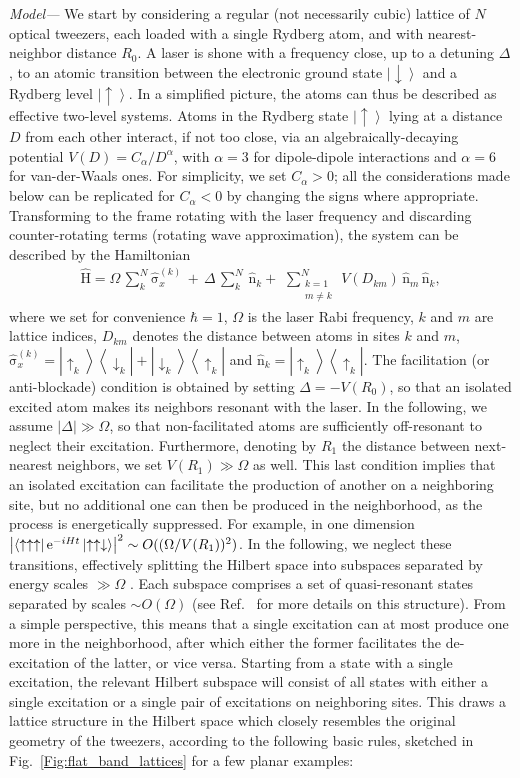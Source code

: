 \documentclass[prl,aps,twocolumn,showpacs,superscriptaddress,longbibliography]{revtex4-1}
\newcommand{\rme}[1]{{\rm{e}}^{#1}}
\newcommand{\lan}{\left\langle}
\newcommand{\ran}{\right\rangle}
\newcommand{\abs}[1]{\left| #1 \right|}
\newcommand{\ket}[1]{\left| #1 \ran}
\newcommand{\bra}[1]{\lan #1 \right|}
\newcommand{\proj}[1]{\ket{#1} \bra{#1}}
\newcommand{\up}{\uparrow}
\newcommand{\down}{\downarrow}
\newcommand{\op}[1]{\mathrm{\hat{#1}}}
\begin{document}
\emph{Model---} We start by considering a regular (not necessarily cubic) lattice of $N$ optical tweezers, each loaded with a single Rydberg atom, and with nearest-neighbor distance $R_0$. A laser is shone with a frequency close, up to a detuning $\Delta$, to an atomic transition between the electronic ground state $\ket{\down}$ and a Rydberg level $\ket{\up}$. In a simplified picture, the atoms can thus be described as effective two-level systems. Atoms in the Rydberg state $\ket{\up}$ lying at a distance $D$ from each other interact, if not too close, via an algebraically-decaying potential $V(D) = C_\alpha / D^\alpha$, with $\alpha = 3$ for dipole-dipole interactions and $\alpha = 6$ for van-der-Waals ones. For simplicity, we set $C_\alpha > 0$; all the considerations made below can be replicated for $C_\alpha < 0$ by changing the signs where appropriate. Transforming to the frame rotating with the laser frequency and discarding counter-rotating terms (rotating wave approximation), the system can be described by the Hamiltonian 
%
\begin{align}
 \op{H} = \Omega \, \sum_k^N  \op{\sigma}_x^{(k)} \, + \, \Delta\, \sum_k^N\,\op{n}_k +\,  \,
 \sum_{\substack{k= 1\\ m \ne k}}^N \, V(D_{km}) \, \op{n}_m\, \op{n}_k,
 \label{Eq:Hamil_full}
\end{align}
%
where we set for convenience $\hbar=1$, $\Omega$ is the laser Rabi frequency, $k$ and $m$ are lattice indices, $D_{km}$ denotes the distance between atoms in sites $k$ and $m$, $\op{\sigma}_x^{(k)} = \ket{\up_k} \bra{\down_k} + \ket{\down_k} \bra{\up_k}$ and $\op{n}_k = \proj{\up_k}$. The facilitation (or anti-blockade) condition is obtained by setting $\Delta = -V(R_0)$, so that an isolated excited atom makes its neighbors resonant with the laser. In the following, we assume $\abs{\Delta} \gg \Omega$, so that non-facilitated atoms are sufficiently off-resonant to neglect their excitation. Furthermore, denoting by $R_1$ the distance between next-nearest neighbors, we set $V(R_1) \gg \Omega$ as well. This last condition implies that an isolated excitation can facilitate the production of another on a neighboring site, but no additional one can then be produced in the neighborhood, as the process is energetically suppressed. For example, in one dimension $\abs{\bra{\up \up \up} \rme{-iHt} \ket{\up \up \down}}^2 \sim O((\Omega / V(R_1))^2)$. In the following, we neglect these transitions, effectively splitting the Hilbert space into subspaces separated by energy scales $\gg \Omega$ . Each subspace comprises a set of quasi-resonant states separated by scales $\sim O(\Omega)$ (see Ref.~\cite{a_Marcuzzi_PRL_17} for more details on this structure). From a simple perspective, this means that a single excitation can at most produce one more in the neighborhood, after which either the former facilitates the de-excitation of the latter, or vice versa. Starting from a state with a single excitation, the relevant Hilbert subspace will consist of all states with either a single excitation or a single pair of excitations on neighboring sites. This draws a lattice structure in the Hilbert space which closely resembles the original geometry of the tweezers, according to the following basic rules, sketched in Fig.~\ref{Fig:flat_band_lattices} for a few planar examples:  
\end{document}
